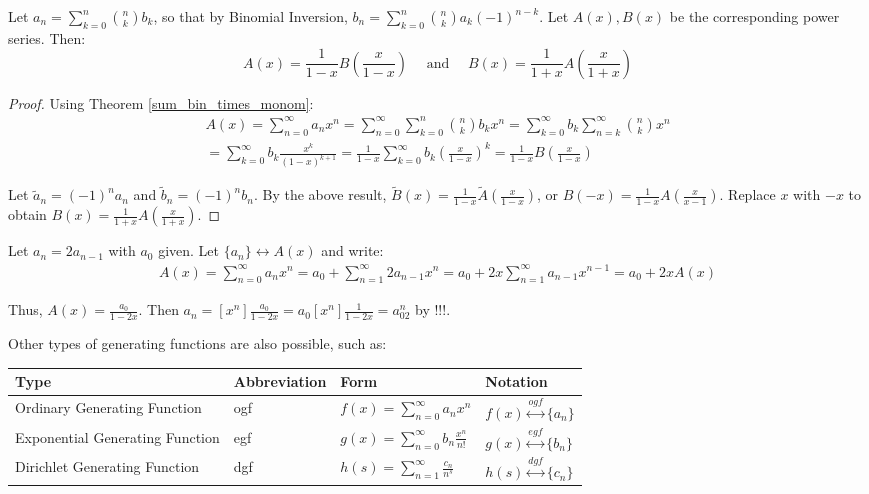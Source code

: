 \documentclass[a4paper]{article}
\begin{document}
\begin{theorem}
Let $a_n=\sum_{k=0}^n\binom nkb_k$, so that by Binomial Inversion, $b_n=\sum_{k=0}^n\binom nka_k(-1)^{n-k}$. Let $A(x),B(x)$ be the corresponding power series. Then:
\begin{equation*}
A(x)=\frac1{1-x}B\left(\frac x{1-x}\right)\quad\text{ and }\quad B(x)=\frac1{1+x}A\left(\frac x{1+x}\right)
\end{equation*}

\begin{hl}
\begin{proof}
Using Theorem \ref{sum_bin_times_monom}:
\begin{multline*}
A(x)
=\sum_{n=0}^\infty a_nx^n
=\sum_{n=0}^\infty\sum_{k=0}^n\binom nkb_kx^n
=\sum_{k=0}^\infty b_k\sum_{n=k}^\infty\binom nkx^n\\
=\sum_{k=0}^\infty b_k\frac{x^k}{(1-x)^{k+1}}
=\frac1{1-x}\sum_{k=0}^\infty b_k\left(\frac{x}{1-x}\right)^k
=\frac1{1-x}B\left(\frac{x}{1-x}\right)
\end{multline*}

Let $\widetilde a_n=(-1)^na_n$ and $\widetilde b_n=(-1)^nb_n$. By the above result, $\widetilde B(x)=\frac1{1-x}\widetilde A\left(\frac x{1-x}\right)$, or $B(-x)=\frac1{1-x}A\left(\frac x{x-1}\right)$. Replace $x$ with $-x$ to obtain $B(x)=\frac1{1+x}A\left(\frac{x}{1+x}\right)$.
\end{proof}
\end{hl}
\end{theorem}

\begin{example}
Let $a_n=2a_{n-1}$ with $a_0$ given. Let $\{a_n\}\longleftrightarrow A(x)$ and write:
\begin{align*}
A(x)
=\sum_{n=0}^\infty a_nx^n
= a_0+\sum_{n=1}^\infty 2a_{n-1}x^n
= a_0+2x\sum_{n=1}^\infty a_{n-1}x^{n-1}
= a_0+2xA(x)
\end{align*}

Thus, $A(x)=\frac{a_0}{1-2x}$. Then $a_n=[x^n]\frac{a_0}{1-2x}=a_0[x^n]\frac{1}{1-2x}=a_02^n$ by !!!.
\end{example}

\begin{definition}
Other types of generating functions are also possible, such as:
\begin{table}[H]
\centering
\begin{NiceTabular}{llll}\toprule
Type&Abbreviation&Form&Notation\\\midrule
Ordinary Generating Function&ogf&$f(x)=\sum_{n=0}^\infty a_nx^n$&$f(x)\overset{ogf}{\longleftrightarrow}\{a_n\}$\\
Exponential Generating Function&egf&$g(x)=\sum_{n=0}^\infty b_n\frac{x^n}{n!}$&$g(x)\overset{egf}{\longleftrightarrow}\{b_n\}$\\
Dirichlet Generating Function&dgf&$h(s)=\sum_{n=1}^\infty\frac{c_n}{n^s}$&$h(s)\overset{dgf}{\longleftrightarrow}\{c_n\}$\\\bottomrule
\end{NiceTabular}
\end{table}
\end{definition}
\end{document}
